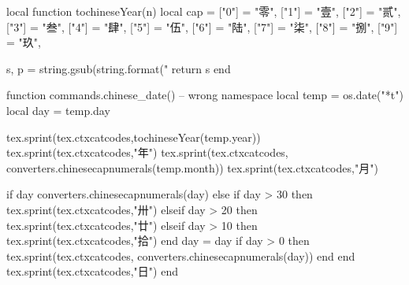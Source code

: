 \setupexternalfigures[%
  location={local,global},
]

\setupmargindata[%
  style={\rm\itx},	%
  align=left,	%
]

\setupfootnotes[
  distance=2ex,	%
]

\startluacode
local function tochineseYear(n)
	local cap = {
		["0"] = "零",
		["1"] = "壹",
		["2"] = "贰",
		["3"] = "叁",
		["4"] = "肆",
		["5"] = "伍",
		["6"] = "陆",
		["7"] = "柒",
		["8"] = "捌",
		["9"] = "玖",
	}

	s, p = string.gsub(string.format("%
	return s
end

function commands.chinese_date() -- wrong namespace
	local temp = os.date("*t")
	local day = temp.day

	tex.sprint(tex.ctxcatcodes,tochineseYear(temp.year))
	tex.sprint(tex.ctxcatcodes,"年")
	tex.sprint(tex.ctxcatcodes, converters.chinesecapnumerals(temp.month))
	tex.sprint(tex.ctxcatcodes,"月")

	if day %
		converters.chinesecapnumerals(day)
	else
		if day > 30 then
			tex.sprint(tex.ctxcatcodes,"卅")
		elseif day > 20 then
			tex.sprint(tex.ctxcatcodes,"廿")
		elseif day > 10 then
			tex.sprint(tex.ctxcatcodes,"拾")
		end
		day = day %
		if day > 0 then
			tex.sprint(tex.ctxcatcodes, converters.chinesecapnumerals(day))
		end
	end
	tex.sprint(tex.ctxcatcodes,"日")
end
\stopluacode

